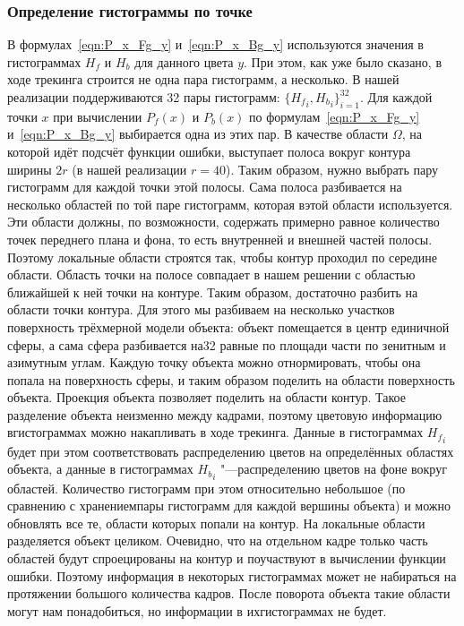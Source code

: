 \subsubsection*{Определение гистограммы по точке} В формулах~\ref{eqn:P_x_Fg_y}
и~\ref{eqn:P_x_Bg_y} используются значения в гистограммах $H_f$ и $H_b$ для
данного цвета $y$. При этом, как уже было сказано, в ходе трекинга строится не
одна пара гистограмм, а несколько. В нашей реализации поддерживаются 32 пары
гистограмм: $\{{H_f}_i, {H_b}_i\}_{i = 1}^{32}$. Для каждой точки $x$ при
вычислении $P_f(x)$ и $P_b(x)$ по формулам~\ref{eqn:P_x_Fg_y}
и~\ref{eqn:P_x_Bg_y} выбирается одна из этих пар.
В качестве области $\Omega$, на которой идёт подсчёт функции ошибки, выступает
полоса вокруг контура ширины $2r$ (в нашей реализации $r = 40$). Таким образом,
нужно выбрать пару гистограмм для каждой точки этой полосы. Сама полоса
разбивается на несколько областей по той паре гистограмм, которая вэтой области
используется. Эти области должны, по возможности, содержать примерно равное
количество точек переднего плана и фона, то есть внутренней и внешней частей
полосы. Поэтому локальные области строятся так, чтобы контур проходил по
середине области. Область точки на полосе совпадает в нашем решении с областью
ближайшей к ней точки на контуре.
Таким образом, достаточно разбить на области точки контура. Для этого мы
разбиваем на несколько участков поверхность трёхмерной модели объекта: объект
помещается в центр единичной сферы, а сама сфера разбивается на32 равные по
площади части по зенитным и азимутным углам. Каждую точку объекта можно
отнормировать, чтобы она попала на поверхность сферы, и таким образом поделить
на области поверхность объекта. Проекция объекта позволяет поделить на области
контур.
Такое разделение объекта неизменно между кадрами, поэтому цветовую информацию
вгистограммах можно накапливать в ходе трекинга. Данные в гистограммах
${H_f}_i$ будет при этом соответствовать распределению цветов на определённых
областях объекта, а данные в гистограммах ${H_b}_i$ "---распределению цветов на
фоне вокруг областей. Количество гистограмм при этом относительно небольшое (по
сравнению с хранениемпары гистограмм для каждой вершины объекта) и можно
обновлять все те, области которых попали на контур.
На локальные области разделяется объект целиком. Очевидно, что на отдельном
кадре только часть областей будут спроецированы на контур и поучаствуют в
вычислении функции ошибки. Поэтому информация в некоторых гистограммах может не
набираться на протяжении большого количества кадров. После поворота объекта
такие области могут нам понадобиться, но информации в ихгистограммах не будет.
